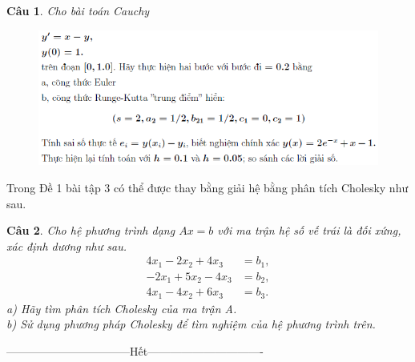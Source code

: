 \documentclass[11pt]{article}
\newtheorem{bt}{Câu}
\begin{document}
\newpage

\begin{bt}
	Cho bài toán Cauchy
\end{bt}

\begin{figure}[h!]
	\centering
	\includegraphics[scale = 0.9]{7}
\end{figure}

\begin{shaded}
Trong Đề 1 bài tập 3 có thể được thay bằng giải hệ bằng phân tích Cholesky như sau.
\end{shaded}

\begin{bt}
	Cho hệ phương trình dạng $Ax=b$ với ma trận hệ số vế trái là đối xứng, xác định dương như sau. 
	\begin{align*}
	4 x_1 - 2 x_2 + 4 x_3   &= b_1, \\
	-2 x_1 + 5 x_2 - 4 x_3  &= b_2, \\
	4 x_1  -4 x_2 + 6 x_3   &= b_3. 
	\end{align*}
	a) Hãy tìm phân tích Cholesky của ma trận A. \\
	b) Sử dụng phương pháp Cholesky để tìm nghiệm của hệ phương trình trên.
\end{bt}

\centerline{———————————Hết——————————-}
\end{document}
